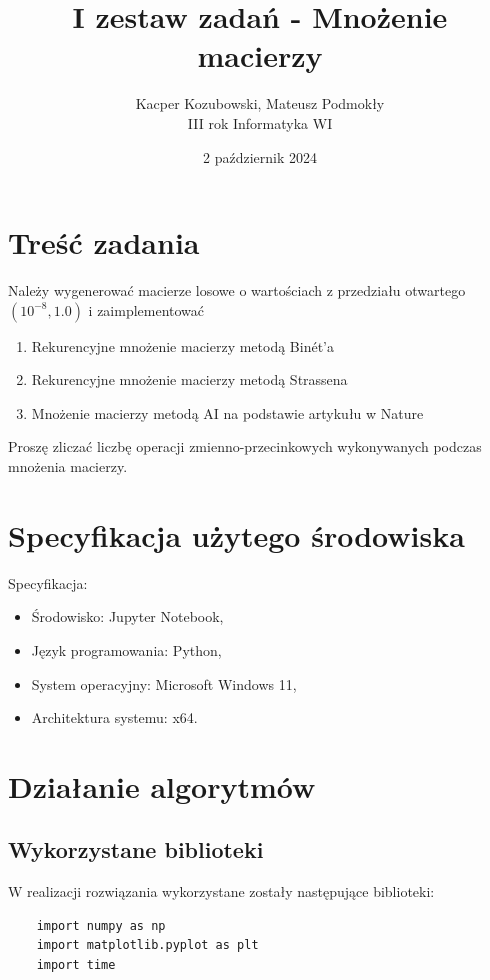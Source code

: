 \documentclass[11pt, leqno]{scrartcl}
\title{I zestaw zadań - Mnożenie macierzy}
\author{Kacper Kozubowski, Mateusz Podmokły \\ III
    rok Informatyka WI}
\date{2 październik 2024}
\begin{document}
    \maketitle
    \section{Treść zadania}
    Należy wygenerować macierze losowe o wartościach
    z przedziału otwartego $(10^{-8},1.0)$
    i zaimplementować
    \begin{enumerate}
        \item Rekurencyjne mnożenie macierzy metodą Binét'a
        \item Rekurencyjne mnożenie macierzy metodą Strassena
        \item Mnożenie macierzy metodą AI na podstawie
            artykułu w Nature
    \end{enumerate}
    Proszę zliczać liczbę operacji zmienno-przecinkowych
    wykonywanych podczas mnożenia macierzy.

    \section{Specyfikacja użytego środowiska}
    Specyfikacja:
    \begin{itemize}
        \item Środowisko: Jupyter Notebook,
        \item Język programowania: Python,
        \item System operacyjny: Microsoft Windows 11,
        \item Architektura systemu: x64.
    \end{itemize}

    \section{Działanie algorytmów}
    \subsection{Wykorzystane biblioteki}
    W realizacji rozwiązania wykorzystane zostały następujące
    biblioteki:
    \begin{lstlisting}
    import numpy as np
    import matplotlib.pyplot as plt
    import time
    \end{lstlisting}
\end{document}
